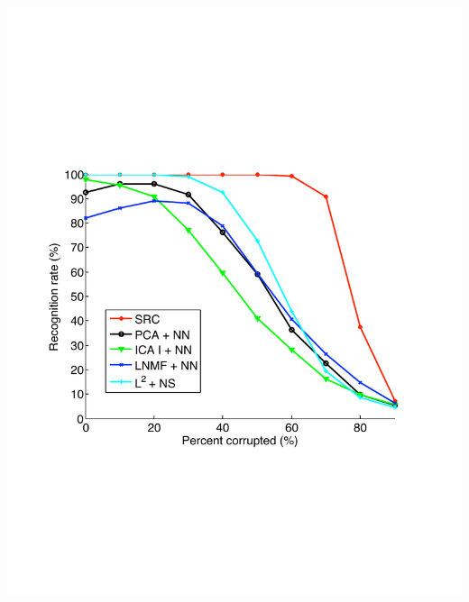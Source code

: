 {\begin{itemize}
\begin{center}
\begin{columns}
\begin{column}{0.5\textwidth}
\begin{center}
\includegraphics[height=.3\textheight]{IEEEPAMI_Occlusion/figures/yb_result_rc.pdf}\\
\end{center}
\end{column}
\end{columns}


\end{center}
\end{itemize}}
